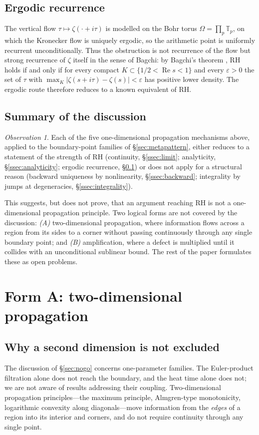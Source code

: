 \documentclass[11pt]{amsart}
\theoremstyle{definition}
\theoremstyle{remark}
\newtheorem{observation}[theorem]{Observation}
\newcommand{\RH}{\mathrm{RH}}
\DeclareMathOperator{\Real}{Re}
\begin{document}
\subsection{Ergodic recurrence}\label{ssec:ergodic}
The vertical flow $\tau\mapsto\zeta(\cdot+i\tau)$ is modelled on the Bohr torus
$\Omega=\prod_p\mathbb{T}_p$, on which the Kronecker flow is uniquely ergodic, so the arithmetic
point is uniformly recurrent unconditionally. Thus the obstruction is not recurrence of the flow
but strong recurrence of $\zeta$ itself in the sense of Bagchi: by Bagchi's theorem
\cite{Bagchi}, $\RH$ holds if and only if for every compact $K\subset\{1/2<\Real s<1\}$ and every
$\varepsilon>0$ the set of $\tau$ with $\max_K|\zeta(s+i\tau)-\zeta(s)|<\varepsilon$ has positive
lower density. The ergodic route therefore reduces to a known equivalent of RH.

\subsection{Summary of the discussion}\label{ssec:summary}
\begin{observation}\label{obs:nogo}
Each of the five one-dimensional propagation mechanisms above, applied to the boundary-point
families of \S\ref{sec:metapattern}, either reduces to a statement of the strength of RH
(continuity, \S\ref{ssec:limit}; analyticity, \S\ref{ssec:analyticity}; ergodic recurrence,
\S\ref{ssec:ergodic}) or does not apply for a structural reason (backward uniqueness by
nonlinearity, \S\ref{ssec:backward}; integrality by jumps at degeneracies,
\S\ref{ssec:integrality}).
\end{observation}
This suggests, but does not prove, that an argument reaching RH is not a one-dimensional
propagation principle. Two logical forms are not covered by the discussion: \emph{(A)}
two-dimensional propagation, where information flows across a region from its sides to a corner
without passing continuously through any single boundary point; and \emph{(B)} amplification,
where a defect is multiplied until it collides with an unconditional sublinear bound. The rest of
the paper formulates these as open problems.

\section{Form A: two-dimensional propagation}\label{sec:formA}

\subsection{Why a second dimension is not excluded}
The discussion of \S\ref{sec:nogo} concerns one-parameter families. The Euler-product
filtration alone does not reach the boundary, and the heat time alone does not; we are not aware
of results addressing their coupling. Two-dimensional propagation principles---the maximum
principle, Almgren-type monotonicity, logarithmic convexity along diagonals---move information
from the \emph{edges} of a region into its interior and corners, and do not require continuity
through any single point.
\end{document}

